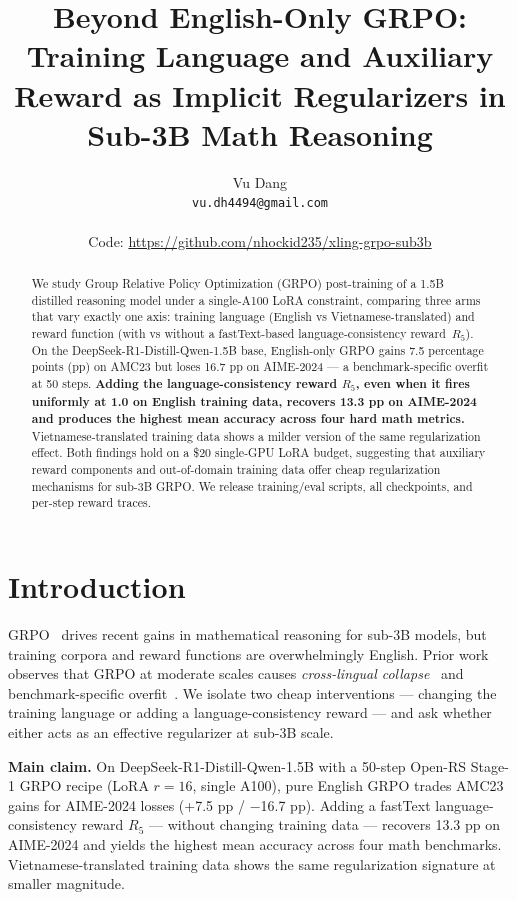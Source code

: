\documentclass[11pt]{article}
\title{Beyond English-Only GRPO: Training Language and Auxiliary Reward
as Implicit Regularizers in Sub-3B Math Reasoning}
\author{Vu Dang \\
  \texttt{vu.dh4494@gmail.com} \\
  \\
  Code: \url{https://github.com/nhockid235/xling-grpo-sub3b}}
\newcommand{\boxedclaim}[1]{%
  \begin{tcolorbox}[colback=blue!4,colframe=blue!50!black,boxrule=0.5pt]%
  \small #1 \end{tcolorbox}}
\begin{document}
\maketitle

\begin{abstract}
We study Group Relative Policy Optimization (GRPO) post-training of a 1.5B distilled
reasoning model under a single-A100 LoRA constraint, comparing three arms that vary
exactly one axis: training language (English vs Vietnamese-translated) and reward
function (with vs without a fastText-based language-consistency reward~$R_5$). On the
DeepSeek-R1-Distill-Qwen-1.5B base, English-only GRPO gains 7.5 percentage points (pp)
on AMC23 but loses 16.7 pp on AIME-2024 --- a benchmark-specific overfit at 50 steps.
\textbf{Adding the language-consistency reward $R_5$, even when it fires uniformly at
1.0 on English training data, recovers 13.3 pp on AIME-2024 and produces the highest
mean accuracy across four hard math metrics.} Vietnamese-translated training data
shows a milder version of the same regularization effect. Both findings hold on a
\$20 single-GPU LoRA budget, suggesting that auxiliary reward components and
out-of-domain training data offer cheap regularization mechanisms for sub-3B GRPO.
We release training/eval scripts, all checkpoints, and per-step reward traces.
\end{abstract}

\section{Introduction}
\label{sec:intro}
GRPO~\cite{deepseekmath_2024,deepseekR1_2025} drives recent gains in mathematical
reasoning for sub-3B models, but training corpora and reward functions are
overwhelmingly English. Prior work observes that GRPO at moderate scales causes
\emph{cross-lingual collapse}~\cite{xlingual_collapse_2025} and benchmark-specific
overfit~\cite{openRS_2025}. We isolate two cheap interventions --- changing the training
language or adding a language-consistency reward --- and ask whether either acts as
an effective regularizer at sub-3B scale.

\boxedclaim{%
\textbf{Main claim.} On DeepSeek-R1-Distill-Qwen-1.5B with a 50-step Open-RS Stage-1
GRPO recipe (LoRA $r{=}16$, single A100), pure English GRPO trades AMC23 gains for
AIME-2024 losses (+7.5 pp / $-$16.7 pp). Adding a fastText language-consistency reward
$R_5$ --- without changing training data --- recovers 13.3 pp on AIME-2024 and yields the
highest mean accuracy across four math benchmarks. Vietnamese-translated training
data shows the same regularization signature at smaller magnitude.
}
\end{document}
